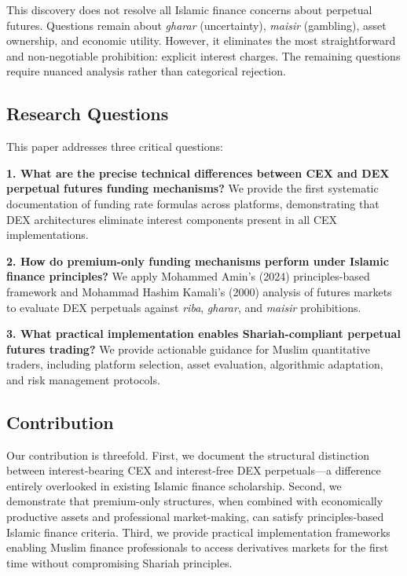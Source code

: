 \documentclass[10pt,twocolumn]{article}
\begin{document}
This discovery does not resolve all Islamic finance concerns about perpetual futures. Questions remain about \textit{gharar} (uncertainty), \textit{maisir} (gambling), asset ownership, and economic utility. However, it eliminates the most straightforward and non-negotiable prohibition: explicit interest charges. The remaining questions require nuanced analysis rather than categorical rejection.

\subsection{Research Questions}

This paper addresses three critical questions:

\textbf{1. What are the precise technical differences between CEX and DEX perpetual futures funding mechanisms?} We provide the first systematic documentation of funding rate formulas across platforms, demonstrating that DEX architectures eliminate interest components present in all CEX implementations.

\textbf{2. How do premium-only funding mechanisms perform under Islamic finance principles?} We apply Mohammed Amin's (2024) principles-based framework and Mohammad Hashim Kamali's (2000) analysis of futures markets to evaluate DEX perpetuals against \textit{riba}, \textit{gharar}, and \textit{maisir} prohibitions.

\textbf{3. What practical implementation enables Shariah-compliant perpetual futures trading?} We provide actionable guidance for Muslim quantitative traders, including platform selection, asset evaluation, algorithmic adaptation, and risk management protocols.

\subsection{Contribution}

Our contribution is threefold. First, we document the structural distinction between interest-bearing CEX and interest-free DEX perpetuals—a difference entirely overlooked in existing Islamic finance scholarship. Second, we demonstrate that premium-only structures, when combined with economically productive assets and professional market-making, can satisfy principles-based Islamic finance criteria. Third, we provide practical implementation frameworks enabling Muslim finance professionals to access derivatives markets for the first time without compromising Shariah principles.
\end{document}

